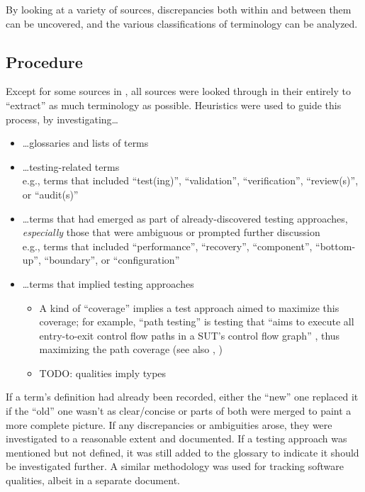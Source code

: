 By looking at a variety of sources, discrepancies both within and between them
can be uncovered, and the various classifications of terminology can be
analyzed.

\subsection{Procedure}

Except for some sources in , all sources were looked
through in their entirely to ``extract'' as much terminology as possible.
Heuristics were used to guide this process, by investigating\dots

\begin{itemize}
      \item \dots glossaries and lists of terms
      \item \dots testing-related terms\\
            e.g., terms that included ``test(ing)'', ``validation'',
            ``verification'', ``review(s)'', or ``audit(s)''
      \item \dots terms that had emerged as part of already-discovered
            testing approaches, \emph{especially} those that were ambiguous
            or prompted further discussion\\
            e.g., terms that included ``performance'', ``recovery'',
            ``component'', ``bottom-up'', ``boundary'', or ``configuration''
      \item \dots terms that implied testing approaches
            \begin{itemize}
                  \item A kind of ``coverage'' implies a test approach aimed to
                        maximize this coverage; for example, ``path testing''
                        is testing that ``aims to execute all entry-to-exit
                        control flow paths in a SUT's control flow graph''
                        \citep[p.~5013]{SWEBOK2024}, thus maximizing the path
                        coverage (see also ,
                        \citep[Fig.~1]{SharmaEtAl2021})
                  \item TODO: qualities imply types
            \end{itemize}
\end{itemize}

If a term's definition had already been recorded, either the ``new'' one
replaced it if the ``old'' one wasn't as clear/concise or parts of both were
merged to paint a more complete picture. If any discrepancies or ambiguities
arose, they were investigated to a reasonable extent and documented. If a
testing approach was mentioned but not defined, it was still added to the
glossary to indicate it should be investigated further. A similar methodology
was used for tracking software qualities, albeit in a separate
document.

